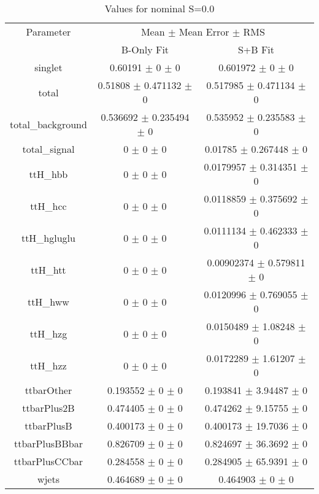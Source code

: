 \begin{table}
\centering
\caption{Values for nominal S=0.0}
\begin{tabular}{ccc}
\toprule
Parameter & \multicolumn{2}{c}{Mean $\pm$ Mean Error $\pm$ RMS}\\
 & B-Only Fit & S+B Fit\\
\midrule
singlet & \num{0.60191} $\pm$ \num{0} $\pm$ \num{0} & \num{0.601972} $\pm$ \num{0} $\pm$ \num{0}\\
total & \num{0.51808} $\pm$ \num{0.471132} $\pm$ \num{0} & \num{0.517985} $\pm$ \num{0.471134} $\pm$ \num{0}\\
total\_background & \num{0.536692} $\pm$ \num{0.235494} $\pm$ \num{0} & \num{0.535952} $\pm$ \num{0.235583} $\pm$ \num{0}\\
total\_signal & \num{0} $\pm$ \num{0} $\pm$ \num{0} & \num{0.01785} $\pm$ \num{0.267448} $\pm$ \num{0}\\
ttH\_hbb & \num{0} $\pm$ \num{0} $\pm$ \num{0} & \num{0.0179957} $\pm$ \num{0.314351} $\pm$ \num{0}\\
ttH\_hcc & \num{0} $\pm$ \num{0} $\pm$ \num{0} & \num{0.0118859} $\pm$ \num{0.375692} $\pm$ \num{0}\\
ttH\_hgluglu & \num{0} $\pm$ \num{0} $\pm$ \num{0} & \num{0.0111134} $\pm$ \num{0.462333} $\pm$ \num{0}\\
ttH\_htt & \num{0} $\pm$ \num{0} $\pm$ \num{0} & \num{0.00902374} $\pm$ \num{0.579811} $\pm$ \num{0}\\
ttH\_hww & \num{0} $\pm$ \num{0} $\pm$ \num{0} & \num{0.0120996} $\pm$ \num{0.769055} $\pm$ \num{0}\\
ttH\_hzg & \num{0} $\pm$ \num{0} $\pm$ \num{0} & \num{0.0150489} $\pm$ \num{1.08248} $\pm$ \num{0}\\
ttH\_hzz & \num{0} $\pm$ \num{0} $\pm$ \num{0} & \num{0.0172289} $\pm$ \num{1.61207} $\pm$ \num{0}\\
ttbarOther & \num{0.193552} $\pm$ \num{0} $\pm$ \num{0} & \num{0.193841} $\pm$ \num{3.94487} $\pm$ \num{0}\\
ttbarPlus2B & \num{0.474405} $\pm$ \num{0} $\pm$ \num{0} & \num{0.474262} $\pm$ \num{9.15755} $\pm$ \num{0}\\
ttbarPlusB & \num{0.400173} $\pm$ \num{0} $\pm$ \num{0} & \num{0.400173} $\pm$ \num{19.7036} $\pm$ \num{0}\\
ttbarPlusBBbar & \num{0.826709} $\pm$ \num{0} $\pm$ \num{0} & \num{0.824697} $\pm$ \num{36.3692} $\pm$ \num{0}\\
ttbarPlusCCbar & \num{0.284558} $\pm$ \num{0} $\pm$ \num{0} & \num{0.284905} $\pm$ \num{65.9391} $\pm$ \num{0}\\
wjets & \num{0.464689} $\pm$ \num{0} $\pm$ \num{0} & \num{0.464903} $\pm$ \num{0} $\pm$ \num{0}\\
\bottomrule
\end{tabular}
\end{table}